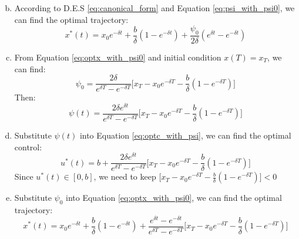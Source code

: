 \documentclass{article}
\begin{document}
\begin{enumerate}[a)]
\begin{equation}
             \end{equation}
    \item According to D.E.S \eqref{eq:canonical_form} and Equation \eqref{eq:psi_with_psi0}, we can find the optimal trajectory:
             \begin{equation}\label{eq:optx_with_psi0}
                 x^*(t)=x_0e^{-\delta t}+\frac{b}{\delta}(1-e^{-\delta t})+\frac{\psi_0}{2\delta}(e^{\delta t}-e^{-\delta t})
             \end{equation}
    \item From Equation \eqref{eq:optx_with_psi0} and initial condition $x(T)=x_T$, we can find:
             \begin{equation}
                 \psi_0=\frac{2\delta}{e^{\delta T}-e^{-\delta T}}\biggl[x_T-x_0e^{-\delta T}-\frac{b}{\delta}(1-e^{-\delta T})\biggr] \label{eq:psi0}
             \end{equation}
            Then:
            \begin{equation}\label{eq:psi}
                \psi(t)=\frac{2\delta e^{\delta t}}{e^{\delta T}-e^{-\delta T}}\biggl[x_T-x_0e^{-\delta T}-\frac{b}{\delta}(1-e^{-\delta T})\biggr]
            \end{equation}
    \item    Substitute $\psi(t)$ into Equation \eqref{eq:optc_with_psi}, we can find the optimal control:
        \begin{equation}\label{eq:optc}
            u^*(t)=b+\frac{2\delta e^{\delta t}}{e^{\delta T}-e^{-\delta T}}\biggl[x_T-x_0e^{-\delta T}-\frac{b}{\delta}(1-e^{-\delta T})\biggr]
        \end{equation}
        Since $u^*(t)\in [0,b]$, we need to keep $\biggl[x_T-x_0e^{-\delta T}-\frac{b}{\delta}(1-e^{-\delta T})\biggr]<0$
    \item Substitute $\psi_0$ into Equation \eqref{eq:optx_with_psi0}, we can find the optimal trajectory:
        \begin{equation}\label{eq:optx}
            x^*(t)=x_0e^{-\delta t}+\frac{b}{\delta}(1-e^{-\delta t})+\frac{e^{\delta t}-e^{-\delta t}}{e^{\delta T}-e^{-\delta T}}\biggl[x_T-x_0e^{-\delta T}-\frac{b}{\delta}(1-e^{-\delta T})\biggr]
        \end{equation}
\end{enumerate}
\end{document}

